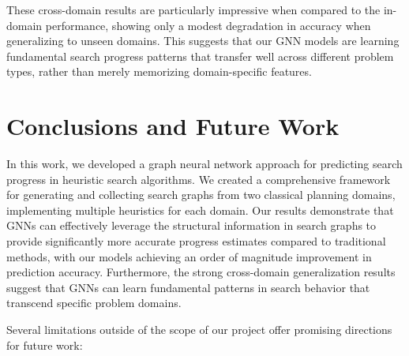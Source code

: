 \documentclass[letterpaper]{article}
\begin{document}
These cross-domain results are particularly impressive when compared to the in-domain performance, showing only a modest degradation in accuracy when generalizing to unseen domains. This suggests that our GNN models are learning fundamental search progress patterns that transfer well across different problem types, rather than merely memorizing domain-specific features.

\section{Conclusions and Future Work}

In this work, we developed a graph neural network approach for predicting search progress in heuristic search algorithms. We created a comprehensive framework for generating and collecting search graphs from two classical planning domains, implementing multiple heuristics for each domain. Our results demonstrate that GNNs can effectively leverage the structural information in search graphs to provide significantly more accurate progress estimates compared to traditional methods, with our models achieving an order of magnitude improvement in prediction accuracy. Furthermore, the strong cross-domain generalization results suggest that GNNs can learn fundamental patterns in search behavior that transcend specific problem domains.

Several limitations outside of the scope of our project offer promising directions for future work:
\end{document}
